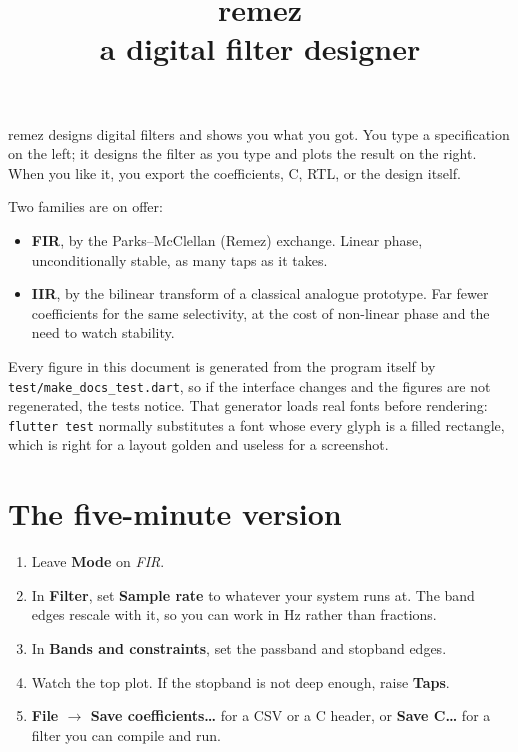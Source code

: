 \documentclass[11pt,a4paper]{article}
\title{\textbf{remez}\\[2mm]\large a digital filter designer}
\author{}
\date{}
\newcommand{\ctl}[1]{\textbf{#1}}
\newcommand{\lit}[1]{\texttt{#1}}
\begin{document}
\maketitle
\thispagestyle{empty}

\noindent
remez designs digital filters and shows you what you got. You type a
specification on the left; it designs the filter as you type and plots the
result on the right. When you like it, you export the coefficients, C, RTL, or
the design itself.

Two families are on offer:

\begin{itemize}[nosep,leftmargin=*]
  \item \textbf{FIR}, by the Parks--McClellan (Remez) exchange. Linear phase,
        unconditionally stable, as many taps as it takes.
  \item \textbf{IIR}, by the bilinear transform of a classical analogue
        prototype. Far fewer coefficients for the same selectivity, at the cost
        of non-linear phase and the need to watch stability.
\end{itemize}

Every figure in this document is generated from the program itself by
\lit{test/make\_docs\_test.dart}, so if the interface changes and the figures
are not regenerated, the tests notice. That generator loads real fonts before
rendering: \lit{flutter test} normally substitutes a font whose every glyph is a
filled rectangle, which is right for a layout golden and useless for a
screenshot.

\vfill
\tableofcontents
\clearpage

\section{The five-minute version}

\begin{enumerate}[leftmargin=*]
  \item Leave \ctl{Mode} on \emph{FIR}.
  \item In \ctl{Filter}, set \ctl{Sample rate} to whatever your system runs at.
        The band edges rescale with it, so you can work in Hz rather than
        fractions.
  \item In \ctl{Bands and constraints}, set the passband and stopband edges.
  \item Watch the top plot. If the stopband is not deep enough, raise
        \ctl{Taps}.
  \item \ctl{File $\rightarrow$ Save coefficients\dots} for a CSV or a C header,
        or \ctl{Save C\dots} for a filter you can compile and run.
\end{enumerate}
\end{document}
